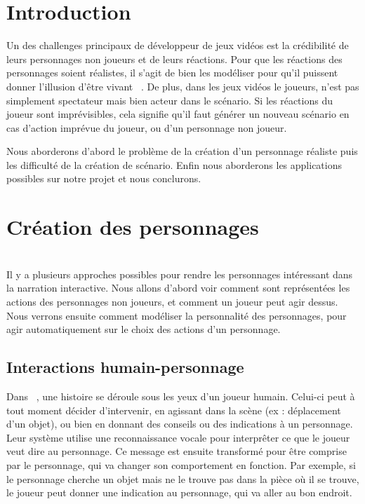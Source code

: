 \documentclass[asi]{picINSA}
\begin{document}
	
	\couverture{}

\tableofcontents{}

\chapter*{Introduction}

Un des challenges principaux de développeur de jeux vidéos est la crédibilité de leurs personnages non joueurs et 
de leurs réactions. Pour que les réactions des personnages soient réalistes, il s'agit de bien les modéliser pour 
qu'il puissent donner l'illusion d'être vivant ~\cite{Bates94therole}. De plus, dans les jeux vidéos le joueurs,
n'est pas simplement spectateur mais bien acteur dans le scénario. Si les réactions du joueur sont imprévisibles,
cela signifie qu'il faut générer un nouveau scénario en cas d'action imprévue du joueur, ou d'un personnage non joueur.

Nous aborderons d'abord le problème de la création d'un personnage réaliste puis les difficulté de la création de scénario.
Enfin nous aborderons les applications possibles sur notre projet et nous conclurons.

\chapter{Création des personnages}
~\\
Il y a plusieurs approches possibles pour rendre les personnages intéressant dans la narration interactive. Nous allons d'abord voir comment sont représentées les actions des personnages non joueurs, et comment un joueur peut agir dessus. Nous verrons ensuite comment modéliser la personnalité des personnages, pour agir automatiquement sur le choix des actions d'un personnage.\\


\section{Interactions humain-personnage}

Dans ~\cite{IRIS:conf/aamas/CavazzaCM2002}, une histoire se déroule sous les yeux d'un joueur humain. Celui-ci peut à tout moment décider d'intervenir, en agissant dans la scène (ex : déplacement d'un objet), ou bien en donnant des conseils ou des indications à un personnage. Leur système utilise une reconnaissance vocale pour interprêter ce que le joueur veut dire au personnage. Ce message est ensuite transformé pour être comprise par le personnage, qui va changer son comportement en fonction. Par exemple, si le personnage cherche un objet mais ne le trouve pas dans la pièce où il se trouve, le joueur peut donner une indication au personnage, qui va aller au bon endroit.\\
\end{document}
